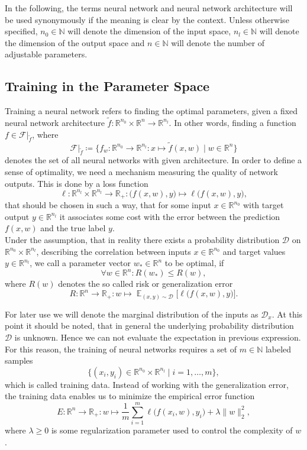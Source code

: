 \documentclass[11pt, a4paper]{article}
\newcommand{\N}{\mathbb{N}}
\newcommand{\R}{\mathbb{R}}
\newcommand{\D}{\mathcal{D}}
\newcommand{\F}{\mathcal{F}}
\DeclareMathOperator*{\E}{\mathbb{E}}
\begin{document}
In the following, the terms neural network and neural network architecture will be used synonymously if the meaning is clear by the context. Unless otherwise specified, $n_0 \in \N$ will denote the dimension of the input space, $n_l \in \N$ will denote the dimension of the output space and $n \in \N$ will denote the number of adjustable parameters.

\subsection{Training in the Parameter Space}\label{sec:Training}

Training a neural network refers to finding the optimal parameters, given a fixed neural network architecture $\tilde{f} : \R^{n_0} \times \R^n \to \R^{n_l}$. In other words, finding a function $f \in \F|_{\tilde{f}}$, where
\[ \F|_{\tilde{f}} \coloneq \Big \{ f_w : \R^{n_0} \to \R^{n_l} : x \mapsto \tilde{f}(x,w) \mid w \in \R^n \Big \} \]
denotes the set of all neural networks with given architecture. In order to define a sense of optimality, we need a mechanism measuring the quality of network outputs. This is done by a loss function
\[ \ell: \R^{n_l} \times \R^{n_l} \to \R_+ : \big ( f(x,w),y \big ) \mapsto \ell \big ( f(x,w),y \big ) ,\]
that should be chosen in such a way, that for some input $x \in \R^{n_0}$ with target output $y \in \R^{n_l}$ it associates some cost with the error between the prediction $f(x,w)$ and the true label $y$. \\

Under the assumption, that in reality there exists a probability distribution $\D$ on $\R^{n_0} \times \R^{n_l}$, describing the correlation between inputs $x \in \R^{n_0}$ and target values $y \in \R^{n_l}$, we call a parameter vector $w_* \in \R^n$ to be optimal, if
\[ \forall w \in \R^n : R(w_*) \leq R(w), \]
where $R(w)$ denotes the so called risk or generalization error 
\[ R : \R^n \to \R_+ : w \mapsto \E_{(x,y) \sim \D } \Big [ \ell \big (f(x,w),y \big ) \Big ]. \]

For later use we will denote the marginal distribution of the inputs as $\D_x$. At this point it should be noted, that in general the underlying probability distribution $\D$ is unknown. Hence we can not evaluate the expectation in previous expression. \\

For this reason, the training of neural networks requires a set of $m \in \N$ labeled samples
\[ \Big \{ (x_i,y_i) \in \R^{n_0} \times \R^{n_l} \mid i=1, \dots, m \Big \}, \]
which is called training data. Instead of working with the generalization error, the training data enables us to minimize the empirical error function
 \[ E : \R^n \to \R_+ : w \mapsto \frac{1}{m} \sum_{i=1}^{m} \ell \big ( f(x_i,w),y_i \big) + \lambda \big \| w \big \|_2^2, \]
where $\lambda \geq 0$ is some regularization parameter used to control the complexity of $w$. \\
 
\end{document}
